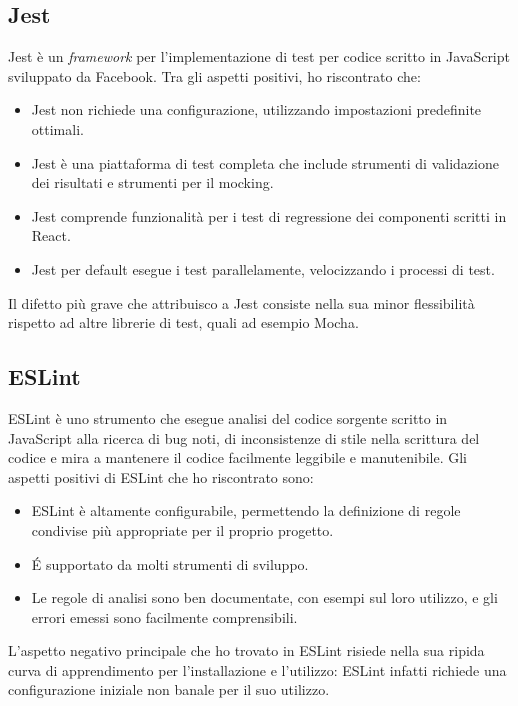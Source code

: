 
\subsection{Jest}

Jest è un \emph{framework} per l'implementazione di test per codice scritto in JavaScript sviluppato da Facebook.
Tra gli aspetti positivi, ho riscontrato che:
\begin{itemize}
	\item Jest non richiede una configurazione, utilizzando impostazioni predefinite ottimali.
	\item Jest è una piattaforma di test completa che include strumenti di validazione dei risultati e  strumenti per il mocking.
	\item Jest comprende funzionalità per i test di regressione dei componenti scritti in React.
	\item Jest per default esegue i test parallelamente, velocizzando i processi di test.
\end{itemize}
Il difetto più grave che attribuisco a Jest consiste nella sua minor flessibilità rispetto ad altre librerie di test, quali ad esempio Mocha.

\subsection{ESLint}

ESLint è uno strumento che esegue analisi del codice sorgente scritto in JavaScript alla ricerca di bug noti, di inconsistenze di stile nella scrittura del codice e mira a mantenere il codice facilmente leggibile e manutenibile.
Gli aspetti positivi di ESLint che ho riscontrato sono:
\begin{itemize}
	\item ESLint è altamente configurabile, permettendo la definizione di regole condivise più appropriate per il proprio progetto.
	\item É supportato da molti strumenti di sviluppo.
	\item Le regole di analisi sono ben documentate, con esempi sul loro utilizzo, e gli errori emessi sono facilmente comprensibili.
\end{itemize}
L'aspetto negativo principale che ho trovato in ESLint risiede nella sua ripida curva di apprendimento per l'installazione e l'utilizzo: ESLint infatti richiede una configurazione iniziale non banale per il suo utilizzo.

